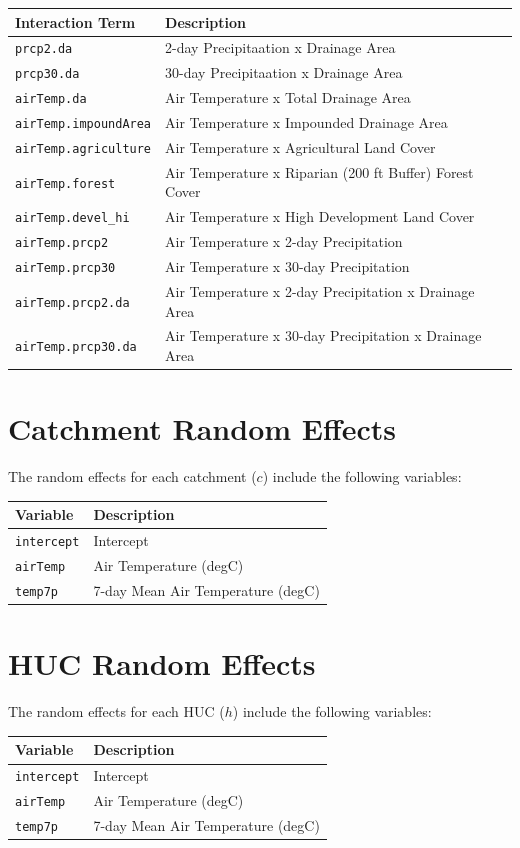 \documentclass[]{book}
\begin{document}
\begin{longtable}[]{@{}ll@{}}
\toprule
Interaction Term & Description\tabularnewline
\midrule
\endhead
\texttt{prcp2.da} & 2-day Precipitaation x Drainage Area\tabularnewline
\texttt{prcp30.da} & 30-day Precipitaation x Drainage Area\tabularnewline
\texttt{airTemp.da} & Air Temperature x Total Drainage Area\tabularnewline
\texttt{airTemp.impoundArea} & Air Temperature x Impounded Drainage Area\tabularnewline
\texttt{airTemp.agriculture} & Air Temperature x Agricultural Land Cover\tabularnewline
\texttt{airTemp.forest} & Air Temperature x Riparian (200 ft Buffer) Forest Cover\tabularnewline
\texttt{airTemp.devel\_hi} & Air Temperature x High Development Land Cover\tabularnewline
\texttt{airTemp.prcp2} & Air Temperature x 2-day Precipitation\tabularnewline
\texttt{airTemp.prcp30} & Air Temperature x 30-day Precipitation\tabularnewline
\texttt{airTemp.prcp2.da} & Air Temperature x 2-day Precipitation x Drainage Area\tabularnewline
\texttt{airTemp.prcp30.da} & Air Temperature x 30-day Precipitation x Drainage Area\tabularnewline
\bottomrule
\end{longtable}

\hypertarget{catchment-random-effects}{%
\section{Catchment Random Effects}\label{catchment-random-effects}}

The random effects for each catchment (\(c\)) include the following variables:

\begin{longtable}[]{@{}ll@{}}
\toprule
Variable & Description\tabularnewline
\midrule
\endhead
\texttt{intercept} & Intercept\tabularnewline
\texttt{airTemp} & Air Temperature (degC)\tabularnewline
\texttt{temp7p} & 7-day Mean Air Temperature (degC)\tabularnewline
\bottomrule
\end{longtable}

\hypertarget{huc-random-effects}{%
\section{HUC Random Effects}\label{huc-random-effects}}

The random effects for each HUC (\(h\)) include the following variables:

\begin{longtable}[]{@{}ll@{}}
\toprule
Variable & Description\tabularnewline
\midrule
\endhead
\texttt{intercept} & Intercept\tabularnewline
\texttt{airTemp} & Air Temperature (degC)\tabularnewline
\texttt{temp7p} & 7-day Mean Air Temperature (degC)\tabularnewline
\bottomrule
\end{longtable}
\end{document}
